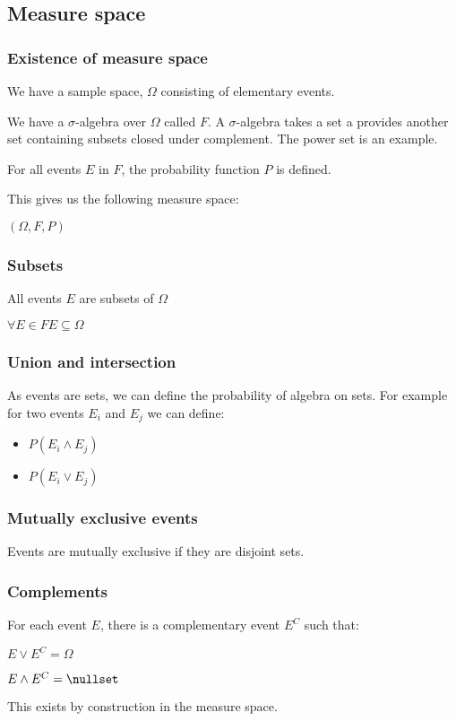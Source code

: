 
\subsection{Measure space}

\subsubsection{Existence of measure space}

We have a sample space, \(\Omega \) consisting of elementary events.

We have a \(\sigma\)-algebra over \(\Omega \) called \(F\). A \(\sigma\)-algebra takes a set a provides another set containing subsets closed under complement. The power set is an example.

For all events \(E\) in \(F\), the probability function \(P\) is defined.

This gives us the following measure space:

$(\Omega, F, P)$

\subsubsection{Subsets}

All events \(E\) are subsets of \(\Omega\)

\(\forall E\in F E\subseteq \Omega\)

\subsubsection{Union and intersection}

As events are sets, we can define the probability of algebra on sets. For example for two events \(E_i\) and \(E_j\) we can define:

\begin{itemize}
\item \(P(E_i\land E_j)\)
\item \(P(E_i\lor E_j)\)
\end{itemize}

\subsubsection{Mutually exclusive events}

Events are mutually exclusive if they are disjoint sets.

\subsubsection{Complements}

For each event \(E\), there is a complementary event \(E^C\) such that:

$E\lor E^C=\Omega$

$E\land E^C=\nullset$

This exists by construction in the measure space.

